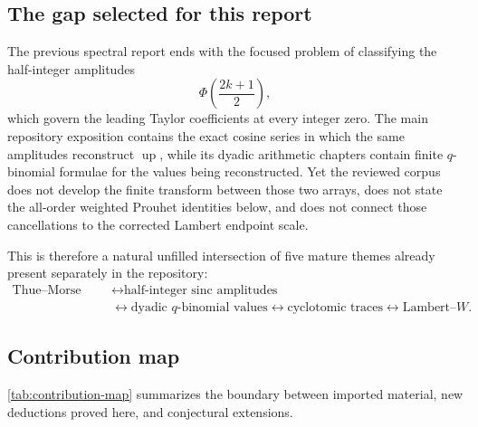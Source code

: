\documentclass[11pt,oneside]{article}
\theoremstyle{definition}
\theoremstyle{remark}
\newcommand{\Up}{\operatorname{up}}
\newcommand{\PhiU}{\Phi}
\begin{document}
\subsection{The gap selected for this report}

The previous spectral report ends with the focused problem of classifying the
half-integer amplitudes
\[
 \PhiU\!\left(\frac{2k+1}{2}\right),
\]
which govern the leading Taylor coefficients at every integer zero.  The main
repository exposition contains the exact cosine series in which the same
amplitudes reconstruct $\Up$, while its dyadic arithmetic chapters contain
finite $q$-binomial formulae for the values being reconstructed.  Yet the
reviewed corpus does not develop the finite transform between those two arrays,
does not state the all-order weighted Prouhet identities below, and does not
connect those cancellations to the corrected Lambert endpoint scale.

This is therefore a natural unfilled intersection of five mature themes already
present separately in the repository:
\[
\begin{aligned}
 \text{Thue--Morse signs}
 &\longleftrightarrow \text{half-integer sinc amplitudes}\\
 &\longleftrightarrow \text{dyadic }q\text{-binomial values}
 \longleftrightarrow \text{cyclotomic traces}
 \longleftrightarrow \text{Lambert--}W.
\end{aligned}
\]

\subsection{Contribution map}

\cref{tab:contribution-map} summarizes the boundary between imported material,
new deductions proved here, and conjectural extensions.
\end{document}
